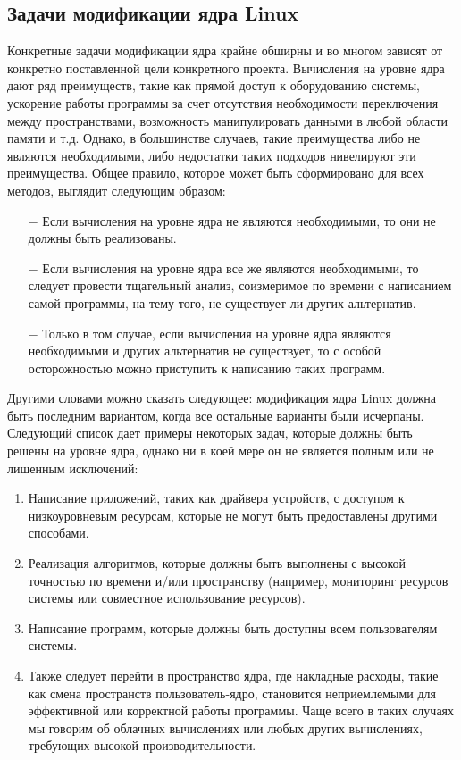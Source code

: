 \subsection{Задачи модификации ядра Linux}\label{subsec:---linux}
Конкретные задачи модификации ядра крайне обширны и во многом зависят от конкретно поставленной цели конкретного проекта.
Вычисления на уровне ядра дают ряд преимуществ, такие как прямой доступ к оборудованию системы,
ускорение работы программы за счет отсутствия необходимости переключения между пространствами,
возможность манипулировать данными в любой области памяти и т.д.
Однако, в большинстве случаев, такие преимущества либо не являются необходимыми, либо недостатки таких подходов нивелируют эти преимущества.
Общее правило, которое может быть сформировано для всех методов, выглядит следующим образом:
\begin{itemize}
    \item[$-$] Если вычисления на уровне ядра не являются необходимыми, то они не должны быть реализованы.
    \item[$-$] Если вычисления на уровне ядра все же являются необходимыми, то следует провести тщательный анализ, соизмеримое по времени с написанием самой программы, на тему того, не существует ли других альтернатив.
    \item[$-$] Только в том случае, если вычисления на уровне ядра являются необходимыми и других альтернатив не существует, то с особой осторожностью можно приступить к написанию таких программ.
\end{itemize}

Другими словами можно сказать следующее: модификация ядра Linux должна быть последним вариантом,
когда все остальные варианты были исчерпаны.
\\
Следующий список дает примеры некоторых задач, которые должны быть решены на уровне ядра, однако ни в коей мере он не является полным или не лишенным исключений:
\begin{enumerate}
    \item Написание приложений, таких как драйвера устройств, с доступом к низкоуровневым ресурсам, которые не могут быть предоставлены другими способами.
    \item Реализация алгоритмов, которые должны быть выполнены с высокой точностью по времени и/или пространству (например, мониторинг ресурсов системы или совместное использование ресурсов)\cite{overhead-timer}.
    \item Написание программ, которые должны быть доступны всем пользователям системы.
    \item Также следует перейти в пространство ядра, где накладные расходы, такие как смена пространств пользователь-ядро, становится неприемлемыми для эффективной или корректной работы программы\cite{overhead-timer}.
    Чаще всего в таких случаях мы говорим об облачных вычислениях\cite{overhead-cloud} или любых других вычислениях, требующих высокой производительности.
\end{enumerate}
